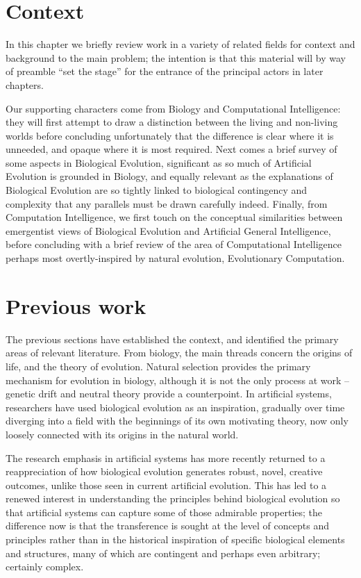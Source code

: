 \documentclass[]{report}
\begin{document}
\chapter{Context}
In this chapter we briefly review work in a variety of related fields for context and background to the main problem; the intention is that this material will by way of preamble ``set the stage'' for the entrance of the principal actors in later chapters.

Our supporting characters come from Biology and Computational Intelligence: they will first attempt to draw a distinction between the living and non-living worlds before concluding unfortunately that the difference is clear where it is unneeded, and opaque where it is most required. Next comes a brief survey of some aspects in Biological Evolution, significant as so much of Artificial Evolution is grounded in Biology, and equally relevant as the explanations of Biological Evolution are so tightly linked to biological contingency and complexity that any parallels must be drawn carefully indeed. Finally, from Computation Intelligence, we first touch on the conceptual similarities between emergentist views of Biological Evolution and Artificial General Intelligence, before concluding with a brief review of the area of Computational Intelligence perhaps most overtly-inspired by natural evolution, Evolutionary Computation.

\chapter{Previous work}
The previous sections have established the context, and identified the primary areas of relevant literature. From biology, the main threads concern the origins of life, and the theory of evolution. Natural selection provides the primary mechanism for evolution in biology, although it is not the only process at work -- genetic drift and neutral theory provide a counterpoint. In artificial systems, researchers have used biological evolution as an inspiration, gradually over time diverging into a field with the beginnings of its own motivating theory, now only loosely connected with its origins in the natural world.

The research emphasis in artificial systems has more recently returned to a reappreciation of how biological evolution generates robust, novel, creative outcomes, unlike those seen in current artificial evolution. This has led to a renewed interest in understanding the principles behind biological evolution so that artificial systems can capture some of those admirable properties; the difference now is that the transference is sought at the level of concepts and principles rather than in the historical inspiration of specific biological elements and structures, many of which are contingent and perhaps even arbitrary; certainly complex.
\end{document}
